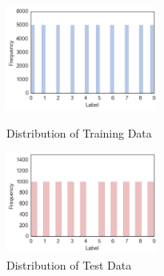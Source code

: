 \begin{figure}[H]
\begin{minipage}{0.5\hsize}
	\begin{center}
	\includegraphics[width=5cm]{picture/Distribution_of_Training_Data.png}
	\end{center}
	\caption{Distribution of Training Data}
	\label{fig:three}
\end{minipage}
\begin{minipage}{0.5\hsize}
\begin{center}
\includegraphics[width=5cm]{picture/Distribution_of_Test_Data.png}
\end{center}
 \caption{Distribution of Test Data}
  \label{fig:four}
 \end{minipage}
\end{figure}

